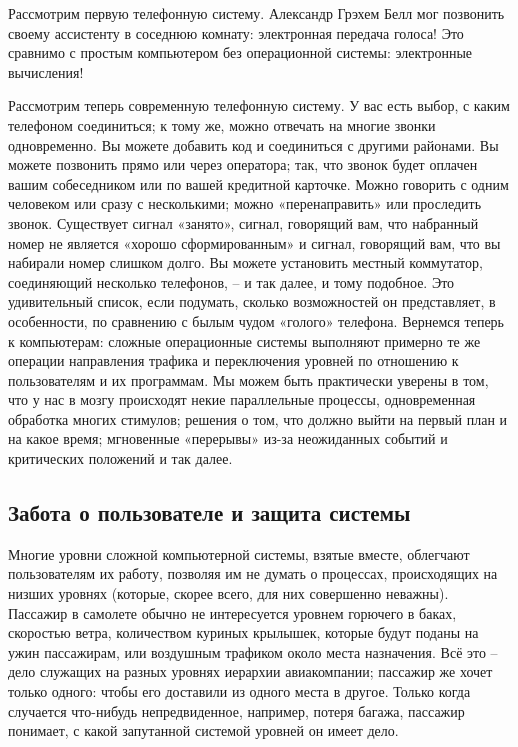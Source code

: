 \documentclass[../main.tex]{subfiles}
\begin{document}
Рассмотрим первую телефонную систему. Александр Грэхем Белл мог позвонить своему ассистенту в соседнюю комнату: электронная передача голоса! Это сравнимо с простым компьютером без операционной системы: электронные вычисления!

Рассмотрим теперь современную телефонную систему. У вас есть выбор, с каким телефоном соединиться; к тому же, можно отвечать на многие звонки одновременно. Вы можете добавить код и соединиться с другими районами. Вы можете позвонить прямо или через оператора; так, что звонок будет оплачен вашим собеседником или по вашей кредитной карточке. Можно говорить с одним человеком или сразу с несколькими; можно «перенаправить» или проследить звонок. Существует сигнал «занято», сигнал, говорящий вам, что набранный номер не является «хорошо сформированным» и сигнал, говорящий вам, что вы набирали номер слишком долго. Вы можете установить местный коммутатор, соединяющий несколько телефонов, \--- и так далее, и тому подобное. Это удивительный список, если подумать, сколько возможностей он представляет, в особенности, по сравнению с былым чудом «голого» телефона. Вернемся теперь к компьютерам: сложные операционные системы выполняют примерно те же операции направления трафика и переключения уровней по отношению к пользователям и их программам. Мы можем быть практически уверены в том, что у нас в мозгу происходят некие параллельные процессы, одновременная обработка многих стимулов; решения о том, что должно выйти на первый план и на какое время; мгновенные «перерывы» из-за неожиданных событий и критических положений и так далее.


\subsection{Забота о пользователе и защита системы}

Многие уровни сложной компьютерной системы, взятые вместе, облегчают пользователям их работу, позволяя им не думать о процессах, происходящих на низших уровнях (которые, скорее всего, для них совершенно неважны). Пассажир в самолете обычно не интересуется уровнем горючего в баках, скоростью ветра, количеством куриных крылышек, которые будут поданы на ужин пассажирам, или воздушным трафиком около места назначения. Всё это \--- дело служащих на разных уровнях иерархии авиакомпании; пассажир же хочет только одного: чтобы его доставили из одного места в другое. Только когда случается что-нибудь непредвиденное, например, потеря багажа, пассажир понимает, с какой запутанной системой уровней он имеет дело.
\end{document}
